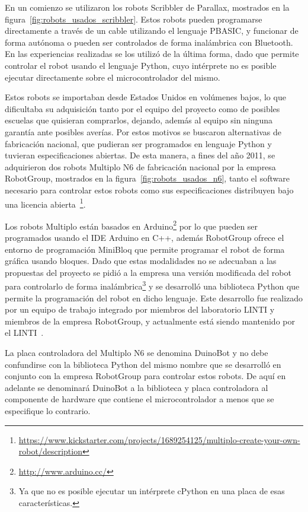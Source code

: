 En un comienzo se utilizaron los robots Scribbler de Parallax, mostrados en la figura~\ref{fig:robots_usados_scribbler}. Estos robots pueden programarse directamente a través de un cable utilizando  el lenguaje
PBASIC, y funcionar de forma autónoma o pueden ser controlados de forma
inalámbrica con Bluetooth. En las experiencias realizadas se los utilizó de la última
forma, dado  que permite controlar el robot usando el lenguaje Python, cuyo intérprete no
es posible ejecutar directamente sobre el microcontrolador del mismo.

Estos robots se importaban desde Estados Unidos en volúmenes bajos, lo que
dificultaba su adquisición tanto por el equipo del proyecto como de posibles
escuelas que quisieran comprarlos, dejando, además al equipo sin ninguna garantía
ante posibles averías. Por estos motivos se buscaron alternativas de fabricación nacional,
que pudieran ser programados en lenguaje Python y tuvieran especificaciones abiertas.
De esta manera, a fines del año 2011, se adquirieron dos robots Multiplo N6 de
fabricación nacional por
la empresa RobotGroup, mostrados en la figura~\ref{fig:robots_usados_n6},
tanto el software necesario para controlar estos robots como sus
especificaciones distribuyen bajo una licencia
abierta~\footnote{\url{https://www.kickstarter.com/projects/1689254125/multiplo-create-your-own-robot/description}}.

Los robots Multiplo están basados en
Arduino\footnote{\url{http://www.arduino.cc/}}
por lo que pueden ser programados
usando el IDE Arduino en C++, además RobotGroup ofrece el entorno de programación
MiniBloq que permite programar el robot de forma gráfica usando bloques.
Dado que estas modalidades no se adecuaban a las propuestas del proyecto
se pidió a la empresa una versión modificada del robot para controlarlo de forma
inalámbrica\footnote{Ya que no es posible ejecutar un intérprete cPython en una
placa de esas características.} y se
desarrolló
una biblioteca Python que permite la programación del robot en dicho lenguaje. Este
desarrollo fue realizado por un equipo de trabajo integrado por miembros del
laboratorio LINTI y miembros de la empresa RobotGroup, y actualmente está
siendo mantenido por el LINTI~\citep{diaz_aprendiendo_2012}.

La placa
controladora del Multiplo N6 se denomina DuinoBot y no debe confundirse con la biblioteca
Python del mismo nombre que se desarrolló en conjunto con la empresa RobotGroup
para controlar estos robots. De aquí en adelante se denominará DuinoBot a la
biblioteca y placa controladora al componente de hardware que contiene el
microcontrolador a menos que se especifique lo contrario.

